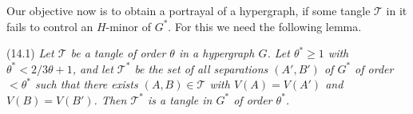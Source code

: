 Our objective now is to obtain a portrayal of a hypergraph, if some tangle $\mathscr{T}$ in it fails to control an $H$-minor of $G^*$. For this we need the following lemma.

\stmt
(14.1) \textit{Let $\mathscr{T}$ be a tangle of order $\theta$ in a hypergraph $G$. Let $\theta^* \ge 1$ with $\theta^* < 2/3\theta + 1$, and let $\mathscr{T}^*$ be the set of all separations $(A', B')$ of $G^*$ of order $< \theta^*$ such that there exists $(A, B) \in \mathscr{T}$ with $V(A) = V(A')$ and $V(B) = V(B')$. Then $\mathscr{T}^*$ is a tangle in $G^*$ of order $\theta^*$.}
